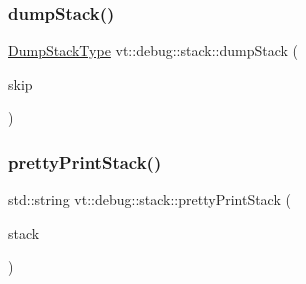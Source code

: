 \subsubsection{\texorpdfstring{dump\+Stack()}{dumpStack()}}
{\footnotesize\ttfamily \hyperlink{namespacevt_1_1debug_1_1stack_af0021ab2e0ec90b6c299c2e7a62d0257}{Dump\+Stack\+Type} vt\+::debug\+::stack\+::dump\+Stack (\begin{DoxyParamCaption}\item[{int}]{skip }\end{DoxyParamCaption})}

\mbox{\label{namespacevt_1_1debug_1_1stack_a6c32eaeca4f5c8da5af1451d77031b3e}} 
\subsubsection{\texorpdfstring{pretty\+Print\+Stack()}{prettyPrintStack()}}
{\footnotesize\ttfamily std\+::string vt\+::debug\+::stack\+::pretty\+Print\+Stack (\begin{DoxyParamCaption}\item[{\hyperlink{namespacevt_1_1debug_1_1stack_a29a3bbd4c51f20720ef437f124de9b62}{Stack\+Vector\+Type} const \&}]{stack }\end{DoxyParamCaption})}

